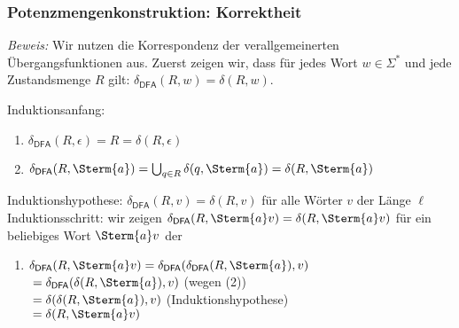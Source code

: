 \documentclass[aspectratio=1610,onlymath]{beamer}
\begin{document}
\begin{frame}[t]\frametitle{Potenzmengenkonstruktion: Korrektheit}


\emph{Beweis:} Wir nutzen die Korrespondenz der verallgemeinerten Übergangsfunktionen aus. Zuerst zeigen wir,
dass für jedes Wort $w\in\Sigma^*$ und jede Zustandsmenge $R$ gilt: $\delta_{\textsf{DFA}}(R,w) = \delta(R,w)$.\pause
\medskip

\alert{Induktionsanfang:}
\begin{enumerate}[(1)]
\item $\delta_{\textsf{DFA}}(R,\epsilon) = R = \delta(R,\epsilon)$\pause
\item $\delta_{\textsf{DFA}}(R,\Sterm{a}) = \bigcup_{q\in R}\delta(q,\Sterm{a}) = \delta(R,\Sterm{a})$\pause
\end{enumerate}\medskip

\alert{Induktionshypothese:} $\delta_{\textsf{DFA}}(R,v) = \delta(R,v)$ für alle Wörter $v$ der Länge $\ell$\\[1ex]
\alert{Induktionsschritt:} wir zeigen $\delta_{\textsf{DFA}}(R,\Sterm{a}v) = \delta(R,\Sterm{a}v)$ für ein beliebiges Wort $\Sterm{a}v$ der 
\begin{enumerate}[(3)]
\item $\delta_{\textsf{DFA}}(R,\Sterm{a}v) = \delta_{\textsf{DFA}}(\delta_{\textsf{DFA}}(R,\Sterm{a}),v)$\\\pause
\hspace{1.58cm}${}= \delta_{\textsf{DFA}}(\delta(R,\Sterm{a}),v)$ \hspace{1cm}(wegen (2))\\\pause
\hspace{1.58cm}${}= \delta(\delta(R,\Sterm{a}),v)$ \hspace{1.45cm}(Induktionshypothese)\\\pause
\hspace{1.58cm}${}= \delta(R,\Sterm{a}v)$
\end{enumerate}

\end{frame}
\end{document}
